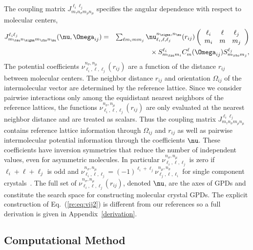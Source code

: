 \documentclass[preprint]{iucr}              %
\newcommand{\mb}[1]{\ensuremath{\mbox{\boldmath $ #1 $}}}
\begin{document}
The coupling matrix $J_{m_\tau n_\sigma m_\rho n_\mu}^{\ell_i
\ell_j}$ specifies the angular dependence with respect to molecular
centers,
\begin{eqnarray}
\label{coupling} J_{m_\tau n_\sigma m_\rho n_\mu}^{\ell_i
\ell_j}(\mb{\nu},\mb{\Omega}_{ij})&=&\sum_{\ell m_i m m_j}
\nu_{\ell_i,\ell,\ell_j}^{n_\sigma,n_\mu}(r_{ij})\left(\begin{array}{ccc}
 \ell_i & \ell & \ell_j \\ m_i & m & m_j
\end{array}\right)\nonumber\\
&&{}\times S^{\ell_i}_{m_\tau m_i}C_{m}^{\ell}(\mb{\Omega}_{ij})
S^{\ell_j}_{m_\rho m_j},
\end{eqnarray}
The potential coefficients
$\nu_{\ell_i,\ell,\ell_j}^{n_\sigma,n_\mu}(r_{ij})$ are a function
of the distance $r_{ij}$ between molecular centers. The neighbor
distance $r_{ij}$ and orientation $\Omega_{ij}$ of the
intermolecular vector are determined by the reference lattice. Since
we consider pairwise interactions only among the equidistant nearest
neighbors of the reference lattices, the functions
$\nu_{\ell_i,\ell,\ell_j}^{n_\sigma,n_\mu}(r_{ij})$ are only
evaluated at the nearest neighbor distance and are treated as
scalars. Thus the coupling matrix $J_{m_\tau n_\sigma m_\rho
n_\mu}^{\ell_i \ell_j}$ contains reference lattice information
through $\Omega_{ij}$ and $r_{ij}$ as well as pairwise
intermolecular potential information through the coefficients
$\mb{\nu}$. These coefficients have inversion symmetries that reduce
the number of independent values, even for asymmetric molecules.  In
particular $\nu_{\ell_i,\ell,\ell_j}^{n_\sigma,n_\mu}$ is zero if
$\ell_i+\ell+\ell_j$ is odd and
$\nu_{\ell_i,\ell,\ell_j}^{n_\sigma,n_\mu}=
(-1)^{\ell_i+\ell_j}\nu_{\ell_j,\ell,\ell_i}^{n_\mu,n_\sigma}$ for
single component crystals~\cite{Avoird80}. The full set of
$\nu_{\ell_i,\ell,\ell_j}^{n_\sigma,n_\mu}(r_{ij})$, denoted
$\mb{\nu}$, are the axes of GPDs and constitute the search space for
constructing molecular crystal GPDs.  The explicit construction of Eq.~(\ref{re:eq:vij2}) is
different from our references so a full derivation is given in Appendix~\ref{derivation}.

\subsection{Computational Method}
\label{Computational_Strategy}
\end{document}
